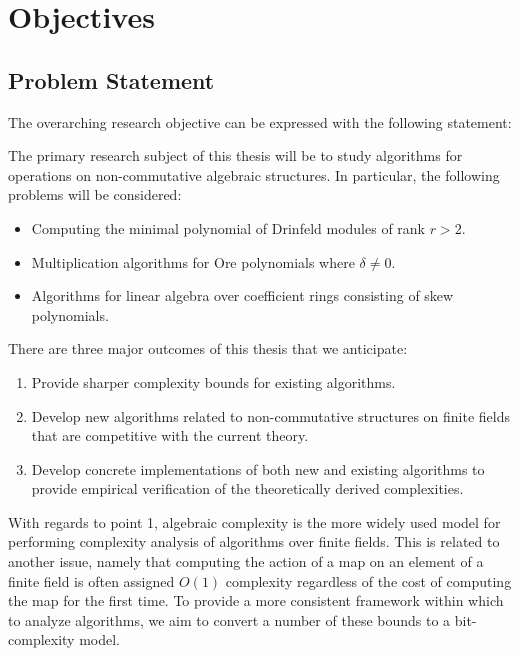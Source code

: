 \chapter{Objectives} \label{ch-2}

\section{Problem Statement}

The overarching research objective can be expressed with the following statement:

\begin{statement*}
The primary research subject of this thesis will be to study algorithms for operations on non-commutative algebraic structures. In particular, the following problems will be considered:

\begin{itemize}
    \item Computing the minimal polynomial of Drinfeld modules of rank $r > 2$.
    \item Multiplication algorithms for Ore polynomials where $\delta \neq 0$.
    \item Algorithms for linear algebra over coefficient rings consisting of skew polynomials.
\end{itemize}

\end{statement*}

There are three major outcomes of this thesis that we anticipate:

\begin{enumerate}
    \item Provide sharper complexity bounds for existing algorithms.

    \item Develop new algorithms related to non-commutative structures on finite fields that are competitive with the current theory.
    
    
    \item Develop concrete implementations of both new and existing algorithms to provide empirical verification of the theoretically derived complexities.
\end{enumerate}

With regards to point 1, algebraic complexity is the more widely used model for performing complexity analysis of algorithms over finite fields. This is related to another issue, namely that computing the action of a map on an element of a finite field is often assigned $O(1)$ complexity regardless of the cost of computing the map for the first time. To provide a more consistent framework within which to analyze algorithms, we aim to convert a number of these bounds to a bit-complexity model.


